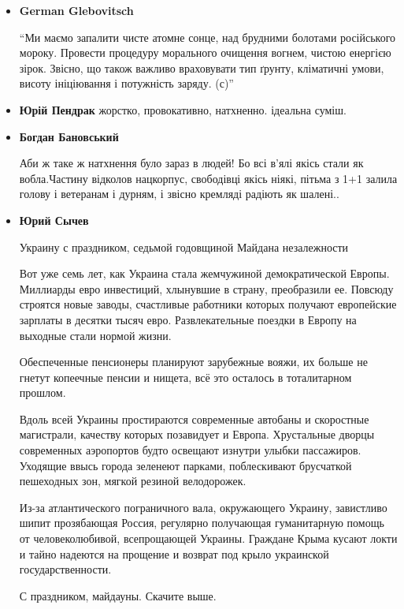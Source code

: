 \begin{itemize}
\item \textbf{German Glebovitsch}

\enquote{Ми маємо запалити чисте атомне сонце, над брудними болотами російського
мороку.  Провести процедуру морального очищення вогнем, чистою енергією зірок.
Звісно, що також важливо враховувати тип ґрунту, кліматичні умови, висоту
ініціювання і потужність заряду. (с)}

\item \textbf{Юрій Пендрак}
жорстко, провокативно, натхненно. ідеальна суміш. 

\item \textbf{Богдан Бановський}

Аби ж таке ж натхнення було зараз в людей! Бо всі в'ялі якісь стали як
вобла.Частину відколов нацкорпус, свободівці якісь ніякі,
пітьма з 1+1 залила голову і ветеранам і дурням, і звісно
кремляді радіють як шалені..

\item \textbf{Юрий Сычев}

Украину с праздником, седьмой годовщиной Майдана незалежности

Вот уже семь лет, как Украина стала жемчужиной демократической Европы.
Миллиарды евро инвестиций, хлынувшие в страну, преобразили ее.
Повсюду строятся новые заводы, счастливые работники которых
получают европейские зарплаты в десятки тысяч евро.
Развлекательные поездки в Европу на выходные стали нормой
жизни.

Обеспеченные пенсионеры планируют зарубежные вояжи, их больше не гнетут
копеечные пенсии и нищета, всё это осталось в тоталитарном
прошлом.

Вдоль всей Украины простираются современные автобаны и скоростные магистрали,
качеству которых позавидует и Европа. Хрустальные дворцы
современных аэропортов будто освещают изнутри улыбки
пассажиров. Уходящие ввысь города зеленеют парками,
поблескивают брусчаткой пешеходных зон, мягкой резиной
велодорожек.

Из-за атлантического пограничного вала, окружающего Украину, завистливо шипит
прозябающая Россия, регулярно получающая гуманитарную помощь от
человеколюбивой, всепрощающей Украины. Граждане Крыма кусают
локти и тайно надеются на прощение и возврат под крыло
украинской государственности.

С праздником, майдауны. Скачите выше.
\end{itemize}
